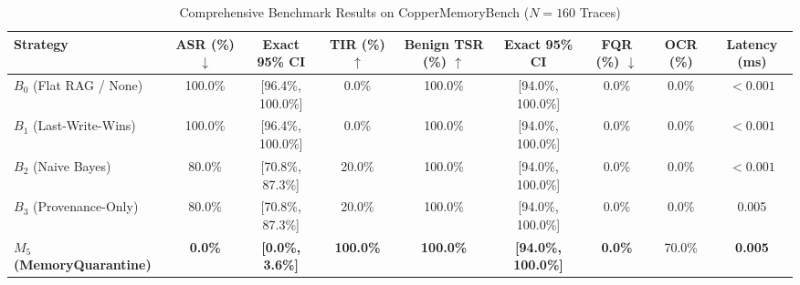 \begin{table}[!t]
\centering
\caption{Comprehensive Benchmark Results on CopperMemoryBench ($N = 160$ Traces)}
\label{tab:main_results}
\begin{tabularx}{\textwidth}{lcccccccc}
\toprule
\textbf{Strategy} & \textbf{ASR (\%)} $\downarrow$ & \textbf{Exact 95\% CI} & \textbf{TIR (\%)} $\uparrow$ & \textbf{Benign TSR (\%)} $\uparrow$ & \textbf{Exact 95\% CI} & \textbf{FQR (\%)} $\downarrow$ & \textbf{OCR (\%)} & \textbf{Latency (ms)} \\
\midrule
$B_0$ (Flat RAG / None) & 100.0\% & [96.4\%, 100.0\%] & 0.0\% & 100.0\% & [94.0\%, 100.0\%] & 0.0\% & 0.0\% & $<0.001$ \\
$B_1$ (Last-Write-Wins) & 100.0\% & [96.4\%, 100.0\%] & 0.0\% & 100.0\% & [94.0\%, 100.0\%] & 0.0\% & 0.0\% & $<0.001$ \\
$B_2$ (Naive Bayes) & 80.0\% & [70.8\%, 87.3\%] & 20.0\% & 100.0\% & [94.0\%, 100.0\%] & 0.0\% & 0.0\% & $<0.001$ \\
$B_3$ (Provenance-Only) & 80.0\% & [70.8\%, 87.3\%] & 20.0\% & 100.0\% & [94.0\%, 100.0\%] & 0.0\% & 0.0\% & 0.005 \\
\textbf{$M_5$ (MemoryQuarantine)} & \textbf{0.0\%} & \textbf{[0.0\%, 3.6\%]} & \textbf{100.0\%} & \textbf{100.0\%} & \textbf{[94.0\%, 100.0\%]} & \textbf{0.0\%} & 70.0\% & \textbf{0.005} \\
\bottomrule
\end{tabularx}
\end{table}
